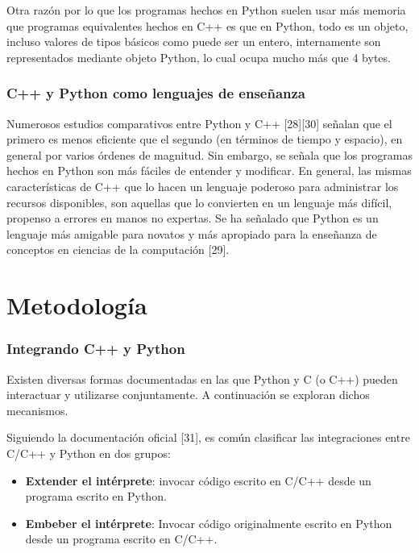 \documentclass[]{article}
\begin{document}
Otra razón por lo que los programas hechos en Python suelen usar más memoria
que programas equivalentes hechos en C++ es que en Python, todo es un objeto,
incluso valores de tipos básicos como puede ser un entero, internamente son
representados mediante objeto Python, lo cual ocupa mucho más que 4 bytes.

\subsubsection{C++ y Python como lenguajes de enseñanza}

Numerosos estudios comparativos entre Python y C++ [28][30]  señalan que el
primero es menos eficiente que el segundo (en términos de tiempo y espacio), en
general por varios órdenes de magnitud. Sin embargo, se señala que los
programas hechos en Python son más fáciles de entender y modificar. En general,
las mismas características de C++ que lo hacen un lenguaje poderoso para
administrar los recursos disponibles, son aquellas que lo convierten en un
lenguaje más difícil, propenso a errores en manos no expertas. Se ha señalado
que Python es un lenguaje más amigable para novatos y más apropiado para la
enseñanza de conceptos en ciencias de la computación [29].

\section{Metodología}\label{sec:met}

\subsubsection{Integrando C++ y Python}

Existen diversas formas documentadas en las que Python y C (o C++) pueden
interactuar y utilizarse conjuntamente. A continuación se exploran dichos
mecanismos.

Siguiendo la documentación oficial [31], es común clasificar las integraciones
entre C/C++ y Python en dos grupos:

\begin{itemize}
    \item \textbf{Extender el intérprete}: invocar código escrito en C/C++
desde un programa escrito en Python.

    \item \textbf{Embeber el intérprete}: Invocar código originalmente escrito
en Python desde un programa escrito en C/C++.
\end{itemize}
\end{document}

